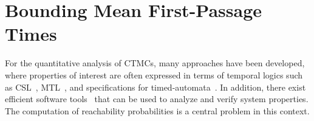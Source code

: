 \chapter{Bounding Mean First-Passage Times}\label{ch:MFPT}







For the quantitative analysis of \acp{CTMC}, many   approaches have been
developed, where properties of interest are often expressed in terms of temporal logics such as
\acs{CSL}~\parencite{aziz1996verifying,baier2000model,baier2003model,spieler2014model},
\acs{MTL}~\parencite{chen2011time},
and specifications for timed-automata~\parencite{chen2009quantitative,mikeev2013fly}.
In addition, there exist
efficient software
tools~\parencite{hinton2006prism,kwiatkowska2011prism,dehnert2017storm}
that can be used to analyze and verify system properties.
The computation of reachability probabilities is a central problem in this context.

